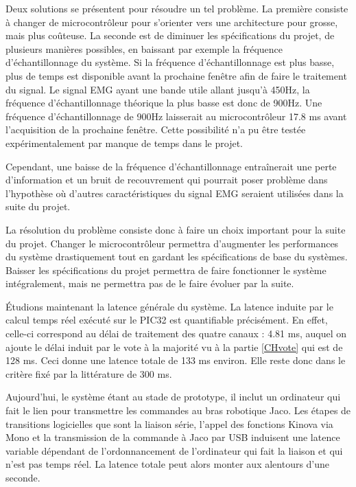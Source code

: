 \documentclass[letterpaper, twoside, 12pt, memoire, creativecommons, hyperref]{thETS}
\begin{document}
Deux solutions se présentent pour résoudre un tel problème. La première consiste à changer de microcontrôleur pour s'orienter vers une architecture pour grosse, mais plus coûteuse. La seconde est de diminuer les spécifications du projet, de plusieurs manières possibles, en baissant par exemple la fréquence d'échantillonnage du système. Si la fréquence d'échantillonnage est plus basse, plus de temps est disponible avant la prochaine fenêtre afin de faire le traitement du signal. Le signal EMG ayant une bande utile allant jusqu'à 450Hz, la fréquence d'échantillonnage théorique la plus basse est donc de 900Hz. Une fréquence d'échantillonnage de 900Hz laisserait au microcontrôleur 17.8 ms avant l'acquisition de la prochaine fenêtre. Cette possibilité n'a pu être testée expérimentalement par manque de temps dans le projet.

Cependant, une baisse de la fréquence d'échantillonnage entraînerait une perte d'information et un bruit de recouvrement qui pourrait poser problème dans l'hypothèse où d'autres caractéristiques du signal EMG seraient utilisées dans la suite du projet. 

La résolution du problème consiste donc à faire un choix important pour la suite du projet. Changer le microcontrôleur permettra d'augmenter les performances du système drastiquement tout en gardant les spécifications de base du systèmes. Baisser les spécifications du projet permettra de faire fonctionner le système intégralement, mais ne permettra pas de le faire évoluer par la suite. 

Étudions maintenant la latence générale du système. La latence induite par le calcul temps réel exécuté sur le PIC32 est quantifiable précisément. En effet, celle-ci correspond au délai de traitement des quatre canaux : 4.81 ms, auquel on ajoute le délai induit par le vote à la majorité vu à la partie \ref{CHvote} qui est de 128 ms. Ceci donne une latence totale de 133 ms environ. Elle reste donc dans le critère fixé par la littérature de 300 ms. 

Aujourd'hui, le système étant au stade de prototype, il inclut un ordinateur qui fait le lien pour transmettre les commandes au bras robotique Jaco. Les étapes de transitions logicielles que sont la liaison série, l'appel des fonctions Kinova via Mono et la transmission de la commande à Jaco par USB induisent une latence variable dépendant de l'ordonnancement de l'ordinateur qui fait la liaison et qui n'est pas temps réel. La latence totale peut alors monter aux alentours d'une seconde. 
\end{document}
